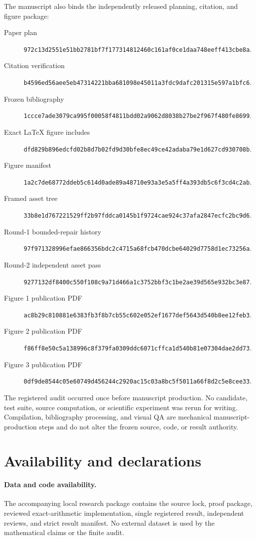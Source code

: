 \documentclass[11pt]{article}
\theoremstyle{definition}
\theoremstyle{remark}
\begin{document}
The manuscript also binds the independently released planning, citation, and
figure package:
\begin{description}
  \item[Paper plan]
  \nolinkurl{972c13d2551e51bb2781bf7f177314812460c161af0ce1daa748eeff413cbe8a}.
  \item[Citation verification]
  \nolinkurl{b4596ed56aee5eb47314221bba681098e45011a3fdc9dafc201315e597a1bfc6}.
  \item[Frozen bibliography]
  \nolinkurl{1ccce7ade3079ca995f00058f4811bdd02a9062d8038b27be2f967f480fe8699}.
  \item[Exact LaTeX figure includes]
  \nolinkurl{dfd829b896edcfd02b8d7b02fd9d30bfe8ec49ce42adaba79e1d627cd930708b}.
  \item[Figure manifest]
  \nolinkurl{1a2c7de68772ddeb5c614d0ade89a48710e93a3e5a5ff4a393db5c6f3cd4c2ab}.
  \item[Framed asset tree]
  \nolinkurl{33b8e1d767221529ff2b97fddca0145b1f9724cae924c37afa2847ecfc2bc9d6}.
  \item[Round-1 bounded-repair history]
  \nolinkurl{97f971328996efae866356bdc2c4715a68fcb470dcbe64029d7758d1ec73256a}.
  \item[Round-2 independent asset pass]
  \nolinkurl{9277132df8400c550f108c9a71d466a1c3752bbf3c1be2ae39d565e932bc3e87}.
  \item[Figure 1 publication PDF]
  \nolinkurl{ac8b29c810881e6383fb3f8b7cb55c602e052ef1677def5643d540b8ee12feb3}.
  \item[Figure 2 publication PDF]
  \nolinkurl{f86ff8e50c5a138996c8f379fa0309ddc6071cffca1d540b81e07304dae2dd73}.
  \item[Figure 3 publication PDF]
  \nolinkurl{0df9de8544c05e60749d456244c2920ac15c03a8bc5f5011a66f8d2c5e8cee33}.
\end{description}

The registered audit occurred once before manuscript production.  No
candidate, test suite, source computation, or scientific experiment was
rerun for writing.  Compilation, bibliography processing, and visual QA are
mechanical manuscript-production steps and do not alter the frozen source,
code, or result authority.

\section*{Availability and declarations}

\paragraph{Data and code availability.}
The accompanying local research package contains the source lock, proof
package, reviewed exact-arithmetic implementation, single registered result,
independent reviews, and strict result manifest.  No external dataset is used
by the mathematical claims or the finite audit.
\end{document}

